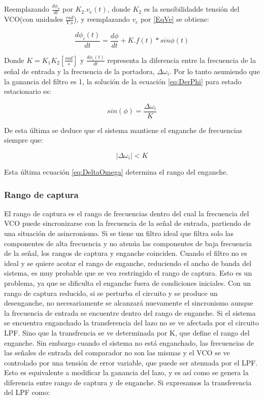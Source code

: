 Reemplazando $\frac{d\phi_o}{dt}$ por $K_2.v_e(t)$, donde $K_2$ es la sensibilidadde tensión del VCO(con unidades $\frac{rad}{V.s}$), y reemplazando $v_e$ por \ref{EqVe} se obtiene:

\begin{equation}
	\frac{d\phi_i(t)}{dt} = \frac{d\phi}{dt} +K.f(t)*sin\phi(t)
	\label{eq:DerPhi}
\end{equation}

Donde $K = K_1 K_2 [\frac{rad}{s}]$ y $\frac{d\phi_i(t)}{dt}$ representa la diferencia entre la frecuencia de la señal de entrada y la frecuencia de la portadora, $\Delta\omega_i$. Por lo tanto asumiendo que la ganancia del filtro es 1, la solución de la ecuación \ref{eq:DerPhi} para estado estacionario es:

\begin{equation}
	sin(\phi) = \frac{\Delta\omega_i}{K}
	\label{eq:SinPhi}
\end{equation}

De esta última se deduce que el sistema mantiene el enganche de frecuencias siempre que:

\begin{equation}
	|\Delta\omega_i|< K
	\label{eq:DeltaOmega}
\end{equation}

Esta última ecuación \ref{eq:DeltaOmega} determina el rango del enganche.

\subsubsection{Rango de captura}
El rango de captura es el rango de frecuencias dentro del cual la frecuencia del VCO puede sincronizarse con la
frecuencia de la señal de entrada, partiendo de una situación de asincronismo. Si se tiene un filtro ideal que filtra solo las componentes de alta frecuencia y no atenúa las componentes de baja frecuencia de la señal, los rangos de captura y enganche coinciden. Cuando el filtro no es ideal y se quiere acotar el rango de enganche, reduciendo el ancho de banda del sistema, es muy probable que se vea restringido el rango de captura. Esto es un problema, ya que se dificulta el enganche fuera de condiciones iniciales. Con un rango de captura reducido, si se perturba el circuito y se produce un desenganche, no necesariamente se alcanzará nuevamente el sincronismo aunque la frecuencia de entrada se encuentre dentro del rango de enganche.
Si el sistema se encuentra enganchado la transferencia del lazo no se ve afectada por el circuito LPF. Sino que la transfrencia se ve determinada por K, que define el rango del enganche. Sin embargo cuando el sistema no está enganchado, las frecuencias de las señales de entrada del comparador no son las mismas y el VCO se ve controlado por una tensión de error variable, que puede ser atenuada por el LPF. Esto es equivalente a modificar la ganancia del lazo, y es así como se genera la diferencia entre rango de captura y de enganche. Si expresamos la transferencia del LPF como:

